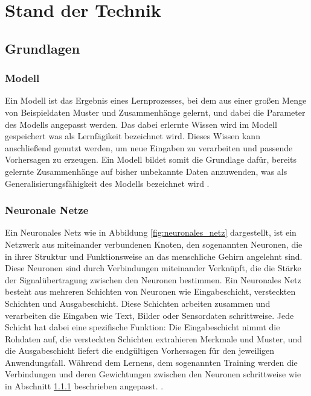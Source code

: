\chapter{Stand der Technik}
\label{chap:stand_der_technik}

\section{Grundlagen}

\subsection{Modell}
\label{sec:modell}

Ein Modell ist das Ergebnis eines Lernprozesses, bei dem aus einer großen Menge von Beispieldaten Muster und Zusammenhänge gelernt, und dabei die Parameter des Modells angepasst werden. 
Das dabei erlernte Wissen wird im Modell gespeichert was als Lernfägikeit bezeichnet wird. Dieses Wissen kann anschließend genutzt werden, um neue Eingaben zu verarbeiten und passende Vorhersagen zu erzeugen. 
Ein Modell bildet somit die Grundlage dafür, bereits gelernte Zusammenhänge auf bisher unbekannte Daten anzuwenden, was als Generalisierungsfähigkeit des Modells bezeichnet wird \parencite{LeCun2015}.

\subsection{Neuronale Netze}
\label{neuronale_netze}

Ein Neuronales Netz wie in Abbildung \ref{fig:neuronales_netz} dargestellt, ist ein Netzwerk aus miteinander verbundenen Knoten, den sogenannten Neuronen, die in ihrer Struktur und Funktionsweise an das menschliche Gehirn angelehnt sind.
Diese Neuronen sind durch Verbindungen miteinander Verknüpft, die die Stärke der Signalübertragung zwischen den Neuronen bestimmen. 
Ein Neuronales Netz besteht aus mehreren Schichten von Neuronen wie Eingabeschicht, versteckten Schichten und Ausgabeschicht.
Diese Schichten arbeiten zusammen und verarbeiten die Eingaben wie Text, Bilder oder Sensordaten schrittweise.
Jede Schicht hat dabei eine spezifische Funktion: Die Eingabeschicht nimmt die Rohdaten auf, die versteckten Schichten extrahieren Merkmale und Muster, und die Ausgabeschicht liefert die endgültigen Vorhersagen für den jeweiligen Anwendungsfall.
Während dem Lernens, dem sogenannten Training werden die Verbindungen und deren Gewichtungen zwischen den Neuronen schrittweise wie in Abschnitt \ref{sec:modell} beschrieben angepasst. \parencite{LeCun2015}.

